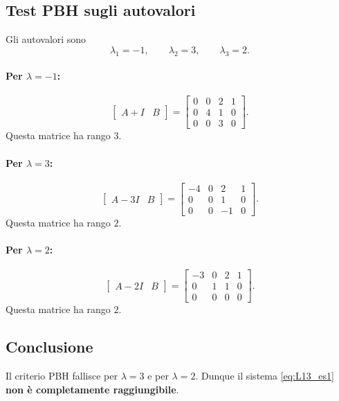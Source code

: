 \subsection*{Test PBH sugli autovalori}

Gli autovalori sono
\[
\lambda_1=-1,\qquad \lambda_2=3,\qquad \lambda_3=2.
\]

\paragraph{Per \(\lambda=-1\):}
\[
\begin{bmatrix}
A+I & B
\end{bmatrix}
=
\begin{bmatrix}
0 & 0 & 2 & 1\\
0 & 4 & 1 & 0\\
0 & 0 & 3 & 0
\end{bmatrix}.
\]
Questa matrice ha rango \(3\).

\paragraph{Per \(\lambda=3\):}
\[
\begin{bmatrix}
A-3I & B
\end{bmatrix}
=
\begin{bmatrix}
-4 & 0 & 2 & 1\\
0 & 0 & 1 & 0\\
0 & 0 & -1 & 0
\end{bmatrix}.
\]
Questa matrice ha rango \(2\).

\paragraph{Per \(\lambda=2\):}
\[
\begin{bmatrix}
A-2I & B
\end{bmatrix}
=
\begin{bmatrix}
-3 & 0 & 2 & 1\\
0 & 1 & 1 & 0\\
0 & 0 & 0 & 0
\end{bmatrix}.
\]
Questa matrice ha rango \(2\).

\subsection*{Conclusione}

Il criterio PBH fallisce per \(\lambda=3\) e per \(\lambda=2\).  
Dunque il sistema \eqref{eq:L13_es1} \textbf{non è completamente raggiungibile}.

